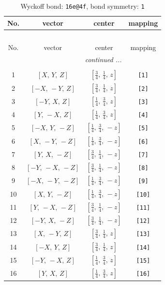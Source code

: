 \documentclass[fleqn,8pt]{jsarticle}
\begin{document}
\begin{longtable}{cccc}
\caption{Wyckoff bond: {\tt 16e@4f}, bond symmetry: {\tt 1}}
 \\
 \hline \hline
No. & vector & center & mapping \\ \hline \endfirsthead

\multicolumn{3}{l}{\tablename\ \thetable{}} \\
 \hline \hline
No. & vector & center & mapping \\ \hline \endhead

 \hline \hline
\multicolumn{3}{r}{\footnotesize\it continued ...} \\ \endfoot

 \hline \hline
\multicolumn{3}{r}{} \\ \endlastfoot

1 & $\left[ X,\, Y,\, Z \right]$ & $\left[ \frac{3}{4},\, \frac{1}{4},\, z \right]$ & {\tt [1]} \\ \hline
2 & $\left[ - X,\, - Y,\, Z \right]$ & $\left[ \frac{3}{4},\, \frac{1}{4},\, z \right]$ & {\tt [2]} \\ \hline
3 & $\left[ - Y,\, X,\, Z \right]$ & $\left[ \frac{1}{4},\, \frac{3}{4},\, z \right]$ & {\tt [3]} \\ \hline
4 & $\left[ Y,\, - X,\, Z \right]$ & $\left[ \frac{1}{4},\, \frac{3}{4},\, z \right]$ & {\tt [4]} \\ \hline
5 & $\left[ - X,\, Y,\, - Z \right]$ & $\left[ \frac{1}{4},\, \frac{3}{4},\, - z \right]$ & {\tt [5]} \\ \hline
6 & $\left[ X,\, - Y,\, - Z \right]$ & $\left[ \frac{1}{4},\, \frac{3}{4},\, - z \right]$ & {\tt [6]} \\ \hline
7 & $\left[ Y,\, X,\, - Z \right]$ & $\left[ \frac{3}{4},\, \frac{1}{4},\, - z \right]$ & {\tt [7]} \\ \hline
8 & $\left[ - Y,\, - X,\, - Z \right]$ & $\left[ \frac{3}{4},\, \frac{1}{4},\, - z \right]$ & {\tt [8]} \\ \hline
9 & $\left[ - X,\, - Y,\, - Z \right]$ & $\left[ \frac{1}{4},\, \frac{3}{4},\, - z \right]$ & {\tt [9]} \\ \hline
10 & $\left[ X,\, Y,\, - Z \right]$ & $\left[ \frac{1}{4},\, \frac{3}{4},\, - z \right]$ & {\tt [10]} \\ \hline
11 & $\left[ Y,\, - X,\, - Z \right]$ & $\left[ \frac{3}{4},\, \frac{1}{4},\, - z \right]$ & {\tt [11]} \\ \hline
12 & $\left[ - Y,\, X,\, - Z \right]$ & $\left[ \frac{3}{4},\, \frac{1}{4},\, - z \right]$ & {\tt [12]} \\ \hline
13 & $\left[ X,\, - Y,\, Z \right]$ & $\left[ \frac{3}{4},\, \frac{1}{4},\, z \right]$ & {\tt [13]} \\ \hline
14 & $\left[ - X,\, Y,\, Z \right]$ & $\left[ \frac{3}{4},\, \frac{1}{4},\, z \right]$ & {\tt [14]} \\ \hline
15 & $\left[ - Y,\, - X,\, Z \right]$ & $\left[ \frac{1}{4},\, \frac{3}{4},\, z \right]$ & {\tt [15]} \\ \hline
16 & $\left[ Y,\, X,\, Z \right]$ & $\left[ \frac{1}{4},\, \frac{3}{4},\, z \right]$ & {\tt [16]} \\
\end{longtable}
\end{document}
